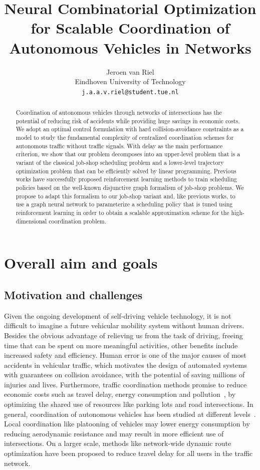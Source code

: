 \documentclass{article}
\title{Neural Combinatorial Optimization for Scalable Coordination of Autonomous
  Vehicles in Networks}
\author{
 Jeroen van Riel \\
Eindhoven University of Technology\\
  \texttt{j.a.a.v.riel@student.tue.nl} \\
}
\theoremstyle{definition}
\theoremstyle{plain}
\begin{document}
\maketitle

\begin{abstract}
  Coordination of autonomous vehicles through networks of
  intersections has the potential of reducing risk of accidents while providing
  huge savings in economic costs.
  We adopt an optimal control formulation with hard collision-avoidance
  constraints as a model to study the fundamental complexity of centralized
  coordination schemes for autonomous traffic without traffic signals. With
  delay as the main performance criterion, we show that our problem decomposes
  into an upper-level problem that is a variant of the classical job-shop
  scheduling problem and a lower-level trajectory optimization problem that can
  be efficiently solved by linear programming.
  Previous works have successfully proposed reinforcement learning methods to
  train scheduling policies based on the well-known disjunctive graph formalism
  of job-shop problems.
  We propose to adapt this formalism to our job-shop variant and, like previous
  works, to use a graph neural network to parameterize a scheduling policy that
  is tuned using reinforcement learning in order to obtain a scalable
  approximation scheme for the high-dimensional coordination problem.
\end{abstract}


\section{Overall aim and goals}

\subsection{Motivation and challenges}
\label{sec:motivation}

Given the ongoing development of self-driving vehicle technology, it is not
difficult to imagine a future vehicular mobility system without human drivers.
Besides the obvious advantage of relieving us from the task of driving, freeing
time that can be spent on more meaningful activities, other benefits include
increased safety and efficiency. Human error is one of the major causes of most
accidents in vehicular traffic, which motivates the design of automated systems
with guarantees on collision avoidance, with the potential of saving millions of
injuries and lives. Furthermore, traffic coordination methods promise to reduce
economic costs such as travel delay, energy consumption and pollution~\cite{fagnantPreparingNationAutonomous2015}, by
optimizing the shared use of resources like parking lots and road intersections.
In general, coordination of autonomous vehicles has been studied at different
levels~\cite{marianiCoordinationAutonomousVehicles2022}. Local coordination like platooning of vehicles may lower energy
consumption by reducing aerodynamic resistance and may result in more efficient
use of intersections. On a larger scale, methods like network-wide dynamic route
optimization have been proposed to reduce travel delay for all users in the
traffic network.
\end{document}
